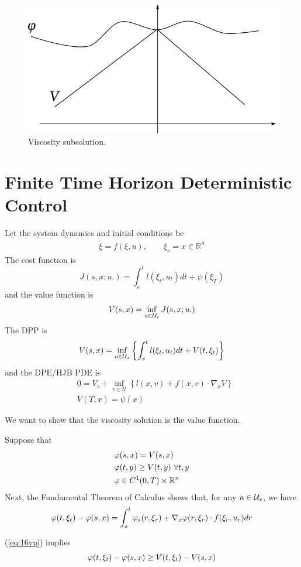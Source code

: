 \begin{figure}[ht!]
\centering
\includegraphics[width=.4\textwidth]{images/16subsol}
\caption{Viscosity subsolution.}
\label{fig:16subsol}
\end{figure}

\section{Finite Time Horizon Deterministic Control}
Let the system dynamics and initial conditions be
\begin{align*}
\dot{\xi} = f(\xi,u), \qquad \xi_s=x\in\mathbb{R}^n
\end{align*}
The cost function is
$$J(s,x;u.) = \int_s^t l(\xi_t,u_t)dt+\psi(\xi_T)$$
and the value function is
$$V(s,x) = \inf_{u\in\mathcal{U}_s}J(s,x;u.)$$
The DPP is
$$V(s,x) = \inf_{u\in\mathcal{U}_x}\left\lbrace \int_s^t l(\xi_t,u_t)dt+V(t,\xi_t) \right\rbrace$$
and the DPE/HJB PDE is
\begin{align}
\label{eq:16dpe}
&0 = V_s + \inf_{v\in\mathcal{U}}\left\lbrace l(x,v)+f(x,v)\cdot\nabla_x V\right\rbrace \\
&V(T,x) = \psi(x) \nonumber
\end{align}

We want to show that the viscosity solution is the value function.

Suppose that
\begin{align}
\label{eq:16vp}
\begin{split}
&\varphi(s,x)=V(s,x) \\
&\varphi(t,y)\geq V(t,y)~\forall t,y \\
&\varphi\in C^1(0,T)\times\mathbb{R}^n
\end{split}
\end{align}
Next, the Fundamental Theorem of Calculus shows that, for any $u\in\mathcal{U}_s$, we have
\begin{align}
\label{eq:16fund}
\varphi(t,\xi_t)-\varphi(s,x) = \int_s^t\varphi_s(r,\xi_r)+\nabla_x\varphi(r,\xi_r)\cdot f(\xi_r,u_r)dr
\end{align}

(\ref{eq:16vp}) implies
\begin{align}
\label{eq:16vpv}
\varphi(t,\xi_t)-\varphi(s,x)\geq V(t,\xi_t)-V(s,x)
\end{align}


